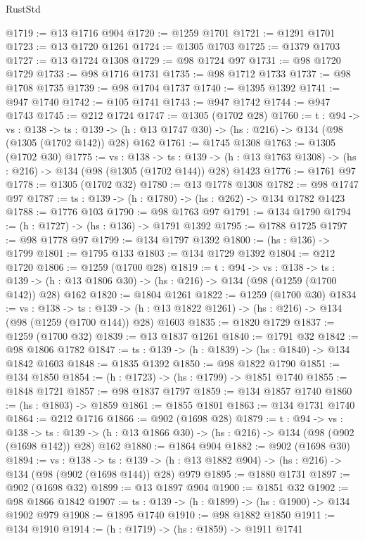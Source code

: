 \begin{lexlean}{RustStd}
\begin{coremodule}
@1719 := @13 @1716 @904
@1720 := @1259 @1701
@1721 := @1291 @1701
@1723 := @13 @1720 @1261
@1724 := @1305 @1703
@1725 := @1379 @1703
@1727 := @13 @1724 @1308
@1729 := @98 @1724 @97
@1731 := @98 @1720 @1729
@1733 := @98 @1716 @1731
@1735 := @98 @1712 @1733
@1737 := @98 @1708 @1735
@1739 := @98 @1704 @1737
@1740 := @1395 @1392
@1741 := @947 @1740
@1742 := @105 @1741
@1743 := @947 @1742
@1744 := @947 @1743
@1745 := @212 @1724
@1747 := @1305 (@1702 @28)
@1760 := {t : @94} ->
  {vs : @138} ->
  {ts : @139} -> (h : @13 @1747 @30) -> (hs : @216) -> @134 (@98 (@1305 (@1702 @142)) @28) @162
@1761 := @1745 @1308
@1763 := @1305 (@1702 @30)
@1775 := {vs : @138} ->
  {ts : @139} -> (h : @13 @1763 @1308) -> (hs : @216) -> @134 (@98 (@1305 (@1702 @144)) @28) @1423
@1776 := @1761 @97
@1778 := @1305 (@1702 @32)
@1780 := @13 @1778 @1308
@1782 := @98 @1747 @97
@1787 := {ts : @139} -> (h : @1780) -> (hs : @262) -> @134 @1782 @1423
@1788 := @1776 @103
@1790 := @98 @1763 @97
@1791 := @134 @1790
@1794 := (h : @1727) -> (hs : @136) -> @1791 @1392
@1795 := @1788 @1725
@1797 := @98 @1778 @97
@1799 := @134 @1797 @1392
@1800 := (hs : @136) -> @1799
@1801 := @1795 @133
@1803 := @134 @1729 @1392
@1804 := @212 @1720
@1806 := @1259 (@1700 @28)
@1819 := {t : @94} ->
  {vs : @138} ->
  {ts : @139} -> (h : @13 @1806 @30) -> (hs : @216) -> @134 (@98 (@1259 (@1700 @142)) @28) @162
@1820 := @1804 @1261
@1822 := @1259 (@1700 @30)
@1834 := {vs : @138} ->
  {ts : @139} -> (h : @13 @1822 @1261) -> (hs : @216) -> @134 (@98 (@1259 (@1700 @144)) @28) @1603
@1835 := @1820 @1729
@1837 := @1259 (@1700 @32)
@1839 := @13 @1837 @1261
@1840 := @1791 @32
@1842 := @98 @1806 @1782
@1847 := {ts : @139} -> (h : @1839) -> (hs : @1840) -> @134 @1842 @1603
@1848 := @1835 @1392
@1850 := @98 @1822 @1790
@1851 := @134 @1850
@1854 := (h : @1723) -> (hs : @1799) -> @1851 @1740
@1855 := @1848 @1721
@1857 := @98 @1837 @1797
@1859 := @134 @1857 @1740
@1860 := (hs : @1803) -> @1859
@1861 := @1855 @1801
@1863 := @134 @1731 @1740
@1864 := @212 @1716
@1866 := @902 (@1698 @28)
@1879 := {t : @94} ->
  {vs : @138} ->
  {ts : @139} -> (h : @13 @1866 @30) -> (hs : @216) -> @134 (@98 (@902 (@1698 @142)) @28) @162
@1880 := @1864 @904
@1882 := @902 (@1698 @30)
@1894 := {vs : @138} ->
  {ts : @139} -> (h : @13 @1882 @904) -> (hs : @216) -> @134 (@98 (@902 (@1698 @144)) @28) @979
@1895 := @1880 @1731
@1897 := @902 (@1698 @32)
@1899 := @13 @1897 @904
@1900 := @1851 @32
@1902 := @98 @1866 @1842
@1907 := {ts : @139} -> (h : @1899) -> (hs : @1900) -> @134 @1902 @979
@1908 := @1895 @1740
@1910 := @98 @1882 @1850
@1911 := @134 @1910
@1914 := (h : @1719) -> (hs : @1859) -> @1911 @1741

\end{coremodule}
\end{lexlean}

